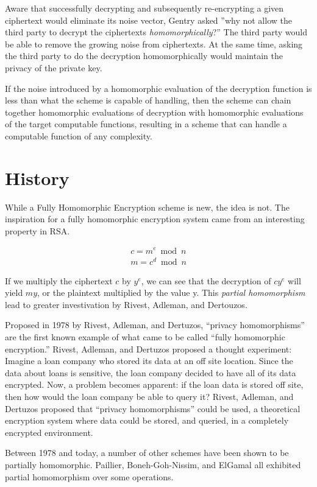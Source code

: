 \documentclass[a4paper,10pt]{article}
\begin{document}
Aware that successfully decrypting and subsequently re-encrypting a
given ciphertext would eliminate its noise vector, Gentry asked ''why
not allow the third party to decrypt the ciphertexts \textit{homomorphically}?''
The third party would be able to remove the growing noise from
ciphertexts. At the same time, asking the third party to do the
decryption homomorphically would maintain the privacy of the private
key.

If the noise introduced by a homomorphic evaluation of the decryption
function is less than what the scheme is capable of handling, then the
scheme can chain together homomorphic evaluations of decryption with
homomorphic evaluations of the target computable functions, resulting
in a scheme that can handle a computable function of any complexity.

\section{History}
While a Fully Homomorphic Encryption scheme is new, the idea is
not. The inspiration for a fully homomorphic encryption system came
from an interesting property in RSA.

\begin{eqnarray*}
c = m ^{e} \bmod n\\
m = c ^{d} \bmod n 
\end{eqnarray*}

If we multiply the ciphertext $c$ by $y ^{e}$, we can see that the
decryption of $ cy^{e} $ will yield $my$, or the plaintext multiplied
by the value y. This \textit{partial homomorphism} lead to greater
investivation by Rivest, Adleman, and Dertouzos.

Proposed in 1978 by Rivest, Adleman, and Dertuzos, ``privacy
homomorphisms'' are the first known example of what came to be called
``fully homomorphic encryption.'' Rivest, Adleman, and Dertuzos
proposed a thought experiment: Imagine a loan company who stored its
data at an off site location. Since the data about loans is sensitive,
the loan company decided to have all of its data encrypted. Now, a
problem becomes apparent: if the loan data is stored off site, then
how would the loan company be able to query it? Rivest, Adleman, and
Dertuzos proposed that ``privacy homomorphisms'' could be used, a
theoretical encryption system where data could be stored, and queried,
in a completely encrypted environment.

Between 1978 and today, a number of other schemes have been shown to
be partially homomorphic. Paillier, Boneh-Goh-Nissim, and ElGamal all
exhibited partial homomorphism over some operations.
\end{document}
